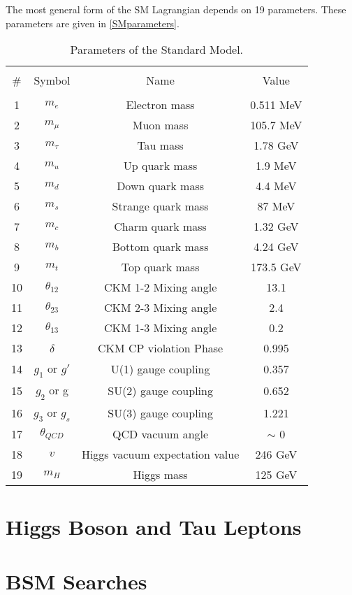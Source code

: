 The most general form of the SM Lagrangian depends on 19 parameters. These parameters are given in \autoref{SMparameters}.
\begin{table*}[h]
	{\setlength{\tabcolsep}{14pt}
		\caption{Parameters of the Standard Model.}
		\begin{center}
			\vspace{-6mm}
			\begin{tabular}{cccc}
				\hline \\[-2.45ex] \hline \\[-2.1ex]
				\# & Symbol & Name & Value \\
				\hline \\[-1.8ex]
				1 & $m_e$ & Electron mass & 0.511 MeV \\
				2 & $m_\mu$ & Muon mass & 105.7 MeV \\
				3 & $m_\tau$ & Tau mass & 1.78 GeV \\
				4 & $m_u$ & Up quark mass & 1.9 MeV \\
				5 & $m_d$ & Down quark mass & 4.4 MeV \\
				6 & $m_s$ & Strange quark mass & 87 MeV \\
				7 & $m_c$ & Charm quark mass & 1.32 GeV \\
				8 & $m_b$ & Bottom quark mass & 4.24 GeV \\
				9 & $m_t$ & Top quark mass & 173.5 GeV \\
				10 & $\theta_{12}$ & CKM 1-2 Mixing angle & 13.1\textdegree \\
				11 & $\theta_{23}$ & CKM 2-3 Mixing angle & 2.4\textdegree \\
				12 & $\theta_{13}$ & CKM 1-3 Mixing angle & 0.2\textdegree \\
				13 & $\delta$ & CKM CP violation Phase & 0.995 \\
				14 & $g_1$ or $g\prime$ & U(1) gauge coupling & 0.357 \\
				15 & $g_2$ or g & SU(2) gauge coupling & 0.652 \\
				16 & $g_3$ or $g_s$ & SU(3) gauge coupling & 1.221 \\
				17 & $\theta_{QCD}$ & QCD vacuum angle & $\sim $ 0 \\
				18 & $v$ & Higgs vacuum expectation value & 246 GeV \\
				19 & $m_H$ & Higgs mass & 125 GeV \\
				\hline
			\end{tabular}
			\vspace{-6mm}
		\end{center}
		\label{SMparameters}}
\end{table*}

\section{Higgs Boson and Tau Leptons}

\section{BSM Searches}

